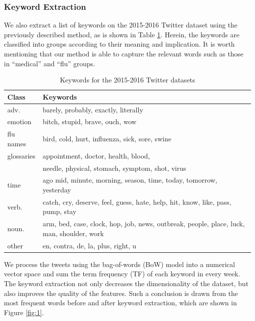 \documentclass[12pt, oneside]{article}
\begin{document}
\subsubsection{Keyword Extraction}
We also extract a list of keywords on the 2015-2016 Twitter dataset using the previously described method, as is shown in Table \ref{table:3}.
Herein, the keywords are classified into groups according to their meaning and implication.
It is worth mentioning that our method is able to capture the relevant words such as those in ``medical'' and ``flu'' groups.

\begin{table}[h!]
  \centering
  \begin{adjustbox}{max width=\textwidth}
    \begin{tabular}{| l | l |} 
      \hline
      \textbf{Class} & \textbf{Keywords} \\ [0.5ex] 
      \hline
      \hline
      adv. & barely, probably, exactly, literally \\
      emotion & bitch, stupid, brave, ouch, wow \\
      flu names & bird, cold, hurt, influenza, sick, sore, swine \\
      glossaries & appointment, doctor, health, blood,  \\
      & needle, physical,  stomach, symptom, shot, virus \\
      time & ago mid, minute, morning, season, time, today, tomorrow, yesterday  \\
      verb. & catch, cry, deserve, feel, guess, hate, help, hit, know, like, pass, pump, stay \\
      noun. & arm, bed, case, clock, hop, job, news, outbreak, people, place, luck, man, shoulder, work  \\
      other & en, contra, de, la, plus, right, u \\
      \hline
    \end{tabular}
  \end{adjustbox}
  \caption{Keywords for the 2015-2016 Twitter datasets}
  \label{table:3}
\end{table}

We process the tweets using the bag-of-words (BoW) model into a numerical vector space and sum the term frequency (TF) of each keyword in every week.
The keyword extraction not only decreases the dimensionality of the dataset, but also improves the quality of the features. 
Such a conclusion is drawn from the most frequent words before and after keyword extraction, which are shown in Figure \ref{fig:1}.
\end{document}
